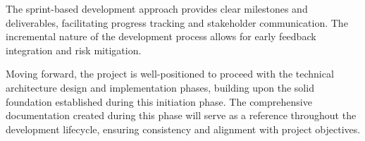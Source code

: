 The sprint-based development approach provides clear milestones and deliverables, facilitating progress tracking and stakeholder communication. The incremental nature of the development process allows for early feedback integration and risk mitigation.

Moving forward, the project is well-positioned to proceed with the technical architecture design and implementation phases, building upon the solid foundation established during this initiation phase. The comprehensive documentation created during this phase will serve as a reference throughout the development lifecycle, ensuring consistency and alignment with project objectives.